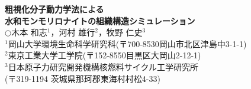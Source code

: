 ﻿\documentclass[11pt,a4j]{jarticle}
\newlength{\minitwocolumn}
\begin{document}
\newcommand{\fat}[1]{\mbox{\boldmath $#1$}}
\newcommand{\D}{\partial}
\newcommand{\w}{\omega}
\newcommand{\ga}{\alpha}
\newcommand{\gb}{\beta}
\newcommand{\gx}{\xi}
\newcommand{\gz}{\zeta}
\newcommand{\vhat}[1]{\hat{\fat{#1}}}
\newcommand{\spc}{\vspace{0.7\baselineskip}}
\newcommand{\halfspc}{\vspace{0.3\baselineskip}}

\pagestyle{empty}
\newcommand{\twofig}[2]
 {
   \begin{figure}[h]
     \begin{minipage}[t]{\minitwocolumn}
         \begin{center}   #1
         \end{center}
     \end{minipage}
         \hspace{\columnsep}
     \begin{minipage}[t]{\minitwocolumn}
         \begin{center} #2
         \end{center}
     \end{minipage}
   \end{figure}
 }
\begin{center}
{\LARGE \bf 
粗視化分子動力学法による\\水和モンモリロナイトの組織構造シミュレーション\\
} 
 $\bigcirc$木本 和志$^1$，河村 雄行$^2$，牧野 仁史$^3$\\
$^1$岡山大学環境生命科学研究科(〒700-8530岡山市北区津島中3-1-1)\\
$^2$東京工業大学工学院(〒152-8550目黒区大岡山2-12-1)\\
$^3$日本原子力研究開発機構核燃料サイクル工学研究所\\
(〒319-1194 茨城県那珂郡東海村村松4-33)
\end{center}
\end{document}

